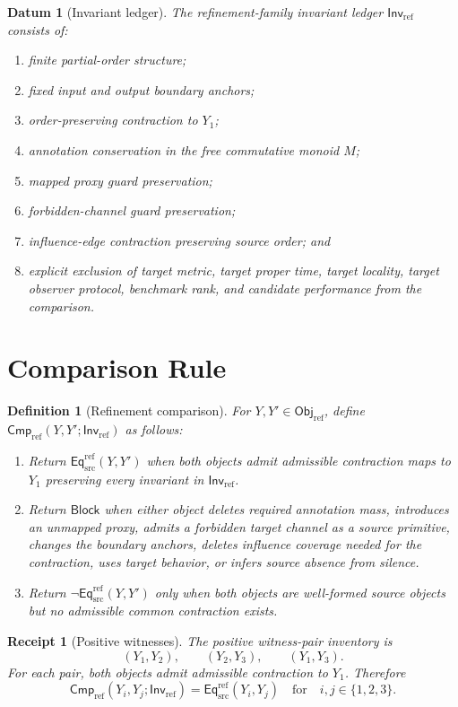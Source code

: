 \documentclass[11pt]{article}
\newcommand{\EqRef}{\mathsf{Eq}_{\mathrm{src}}^{\mathrm{ref}}}
\newcommand{\ObjRef}{\mathsf{Obj}_{\mathrm{ref}}}
\newcommand{\InvRef}{\mathsf{Inv}_{\mathrm{ref}}}
\newcommand{\CmpRef}{\mathsf{Cmp}_{\mathrm{ref}}}
\newcommand{\Block}{\mathsf{Block}}
\newtheorem{definitionblock}{Definition}
\newtheorem{datum}{Datum}
\newtheorem{receipt}{Receipt}
\begin{document}
\begin{datum}[Invariant ledger]
The refinement-family invariant ledger \(\InvRef\) consists of:
\begin{enumerate}
    \item finite partial-order structure;
    \item fixed input and output boundary anchors;
    \item order-preserving contraction to \(Y_{1}\);
    \item annotation conservation in the free commutative monoid \(M\);
    \item mapped proxy guard preservation;
    \item forbidden-channel guard preservation;
    \item influence-edge contraction preserving source order; and
    \item explicit exclusion of target metric, target proper time, target
    locality, target observer protocol, benchmark rank, and candidate
    performance from the comparison.
\end{enumerate}
\end{datum}

\section{Comparison Rule}

\begin{definitionblock}[Refinement comparison]
For \(Y,Y'\in\ObjRef\), define \(\CmpRef(Y,Y';\InvRef)\) as follows:
\begin{enumerate}
    \item Return \(\EqRef(Y,Y')\) when both objects admit admissible
    contraction maps to \(Y_{1}\) preserving every invariant in
    \(\InvRef\).
    \item Return \(\Block\) when either object deletes required annotation
    mass, introduces an unmapped proxy, admits a forbidden target channel
    as a source primitive, changes the boundary anchors, deletes influence
    coverage needed for the contraction, uses target behavior, or infers
    source absence from silence.
    \item Return \(\neg\EqRef(Y,Y')\) only when both objects are
    well-formed source objects but no admissible common contraction exists.
\end{enumerate}
\end{definitionblock}

\begin{receipt}[Positive witnesses]
The positive witness-pair inventory is
\[
    (Y_{1},Y_{2}),\qquad (Y_{2},Y_{3}),\qquad (Y_{1},Y_{3}).
\]
For each pair, both objects admit admissible contraction to \(Y_{1}\).
Therefore
\[
    \CmpRef(Y_i,Y_j;\InvRef)=\EqRef(Y_i,Y_j)
    \quad\text{for}\quad i,j\in\{1,2,3\}.
\]
\end{receipt}
\end{document}
